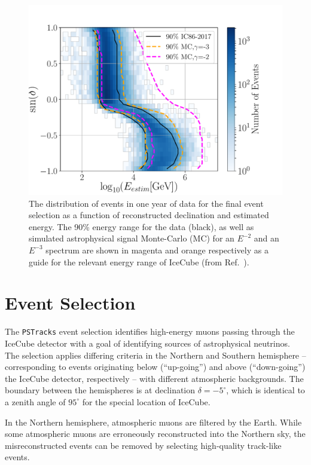 \documentclass[aps,10pt,prd,twocolumn,floats,letterpaper,showpacs,nofootinbib,bibnotes,notitlepage,superscriptaddress,floatfix]{revtex4-1}
\begin{document}
\begin{figure}[t]
\centering
\includegraphics[width=\linewidth,viewport= 0 0 530 390, clip=true]{IC86II_enDist.pdf}
\caption[]{The distribution of events in one year of data for the final event selection as a function of reconstructed declination and estimated energy. The 90\% energy range for the data (black), as well as simulated astrophysical signal Monte-Carlo (MC) for an $E^{-2}$ and an $E^{-3}$ spectrum are shown in magenta and orange respectively as a guide for the relevant energy range of IceCube (from Ref.~\cite{Aartsen:2019fau}).}\label{fig:enDist}
\end{figure}

\section{Event Selection}\label{secII}

The {\tt PSTracks} event selection identifies high-energy muons passing through the IceCube detector with a goal of identifying sources of astrophysical neutrinos. The selection applies differing criteria in the Northern and Southern hemisphere -- corresponding to events originating below (``up-going'') and above (``down-going'') the IceCube detector, respectively -- with different atmospheric backgrounds. The boundary between the hemispheres is at declination $\delta=-5^\circ$, which is identical to a zenith angle of $95^\circ$ for the special location of IceCube. 

In the Northern hemisphere, atmospheric muons are filtered by the Earth. While some atmospheric muons are erroneously reconstructed into the Northern sky, the misreconstructed events can be removed by selecting high-quality track-like events. 
\end{document}
